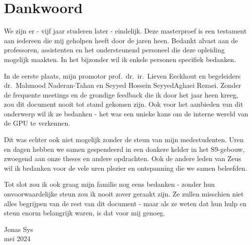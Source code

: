 \chapter*{Dankwoord}

We zijn er - vijf jaar studeren later - eindelijk.
Deze masterproef is een testament aan iedereen die mij geholpen heeft door de jaren heen.
Bedankt alvast aan de professoren, assistenten en het ondersteunend personeel die deze opleiding mogelijk maakten.
In het bijzonder wil ik enkele personen specifiek bedanken.

In de eerste plaats, mijn promotor prof.\ dr.\ ir.\ Lieven Eeckhout en begeleiders dr.\ Mahmood Naderan-Tahan en Seyyed Hossein SeyyedAghaei Rezaei.
Zonder de frequente meetings en de grondige feedback die ik door het jaar heen kreeg, zou dit document nooit tot stand gekomen zijn.
Ook voor het aanbieden van dit onderwerp wil ik ze bedanken - het was een unieke kans om de interne wereld van de GPU te verkennen.

Dit was echter ook niet mogelijk zonder de steun van mijn medestudenten.
Uren en dagen hebben we samen gespendeerd in een donkere kelder in het S9-gebouw, zwoegend aan onze theses en andere opdrachten.
Ook de andere leden van Zeus  wil ik bedanken voor de vele uren plezier en ontspanning die we samen beleefden.

Tot slot zou ik ook graag mijn familie nog eens bedanken - zonder hun onvoorwaardelijke steun zou ik nooit zover geraakt zijn.
Ze zullen misschien niet alles begrijpen van de rest van dit document - maar als ze weten dat hun hulp en steun enorm belangrijk waren, is dat voor mij genoeg.

\begin{flushright}
    Jonas Sys \\
    mei 2024
\end{flushright}